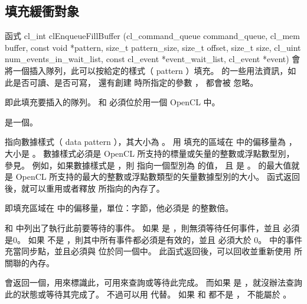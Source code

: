 \subsection{填充緩衝對象}

函式
\startCLFUNC
cl_int clEnqueueFillBuffer (cl_command_queue command_queue,
			cl_mem buffer,
			const void *pattern,
			size_t pattern_size,
			size_t offset,
			size_t size,
			cl_uint num_events_in_wait_list,
			const cl_event *event_wait_list,
			cl_event *event)
\stopCLFUNC
會將一個插入隊列，此可以按給定的樣式（ pattern ）填充。
 的一些用法資訊，如此是否可讀、是否可寫，
還有創建  時所指定的參數 ，
都會被  忽略。

 即此填充要插入的隊列。
 和  必須位於用一個 OpenCL 中。

 是一個。

 指向數據樣式（ data pattern ），其大小為 。
用  填充的區域在  中的偏移量為 ，大小是 。
數據樣式必須是 OpenCL 所支持的標量或矢量的整數或浮點數型別，參見。
例如，如果數據樣式是 ，則  指向一個型別為  的值，
且  是 。
 的最大值就是 OpenCL 所支持的最大的整數或浮點數類型的矢量數據型別的大小。
函式返回後，就可以重用或者釋放  所指向的內存了。

 即填充區域在  中的偏移量，單位：字節，他必須是  的整數倍。

 和  中列出了執行此前要等待的事件。
如果  是 ，則無須等待任何事件，並且  必須是0。
如果  不是 ，則其中所有事件都必須是有效的，並且  必須大於 0。
 中的事件充當同步點，並且必須與  位於同一個中。
此函式返回後，可以回收並重新使用  所關聯的內存。

 會返回一個，用來標識此，可用來查詢或等待此完成。
而如果  是 ，就沒辦法查詢此的狀態或等待其完成了。
不過可以用  代替。
如果  和  都不是 ，  不能屬於 。

